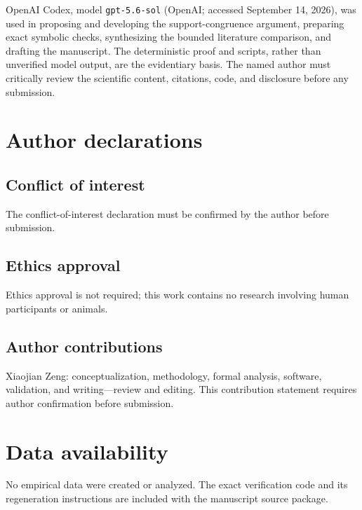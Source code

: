 \documentclass[aip,jmp,preprint]{revtex4-2}
\begin{document}
OpenAI Codex, model \texttt{gpt-5.6-sol} (OpenAI; accessed September 14, 2026), was used in proposing and developing the support-congruence argument, preparing exact symbolic checks, synthesizing the bounded literature comparison, and drafting the manuscript.  The deterministic proof and scripts, rather than unverified model output, are the evidentiary basis.  The named author must critically review the scientific content, citations, code, and disclosure before any submission.

\section*{Author declarations}

\subsection*{Conflict of interest}
The conflict-of-interest declaration must be confirmed by the author before submission.

\subsection*{Ethics approval}
Ethics approval is not required; this work contains no research involving human participants or animals.

\subsection*{Author contributions}
Xiaojian Zeng: conceptualization, methodology, formal analysis, software, validation, and writing---review and editing.  This contribution statement requires author confirmation before submission.

\section*{Data availability}

No empirical data were created or analyzed.  The exact verification code and its regeneration instructions are included with the manuscript source package.



\end{document}
